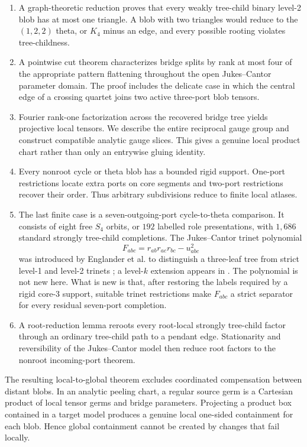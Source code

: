 \begin{enumerate}[label=\textup{(\roman*)}]
\item A graph-theoretic reduction proves that every weakly tree-child binary level-2 blob has at most one triangle.  A blob with two triangles would reduce to the $(1,2,2)$ theta, or $K_4$ minus an edge, and every possible rooting violates tree-childness.
\item A pointwise cut theorem characterizes bridge splits by rank at most four of the appropriate pattern flattening throughout the open Jukes--Cantor parameter domain.  The proof includes the delicate case in which the central edge of a crossing quartet joins two active three-port blob tensors.
\item Fourier rank-one factorization across the recovered bridge tree yields projective local tensors.  We describe the entire reciprocal gauge group and construct compatible analytic gauge slices.  This gives a genuine local product chart rather than only an entrywise gluing identity.
\item Every nonroot cycle or theta blob has a bounded rigid support.  One-port restrictions locate extra ports on core segments and two-port restrictions recover their order.  Thus arbitrary subdivisions reduce to finite local atlases.
\item The last finite case is a seven-outgoing-port cycle-to-theta comparison.  It consists of eight free $S_4$ orbits, or $192$ labelled role presentations, with $1{,}686$ standard strongly tree-child completions.  The Jukes--Cantor trinet polynomial
\[
F_{abc}=r_{ab}r_{ac}r_{bc}-u_{abc}^{2}
\]
was introduced by Englander et al. to distinguish a three-leaf tree from strict level-1 and level-2 trinets \cite[Proposition~2.26 in the April 2025 version]{EnglanderEtAl2025}; a level-$k$ extension appears in \cite[Lemma~5.5]{BritsEtAl2026}.  The polynomial is not new here.  What is new is that, after restoring the labels required by a rigid core-3 support, suitable trinet restrictions make $F_{abc}$ a strict separator for every residual seven-port completion.
\item A root-reduction lemma reroots every root-local strongly tree-child factor through an ordinary tree-child path to a pendant edge.  Stationarity and reversibility of the Jukes--Cantor model then reduce root factors to the nonroot incoming-port theorem.
\end{enumerate}

The resulting local-to-global theorem excludes coordinated compensation between distant blobs.  In an analytic peeling chart, a regular source germ is a Cartesian product of local tensor germs and bridge parameters.  Projecting a product box contained in a target model produces a genuine local one-sided containment for each blob.  Hence global containment cannot be created by changes that fail locally.


